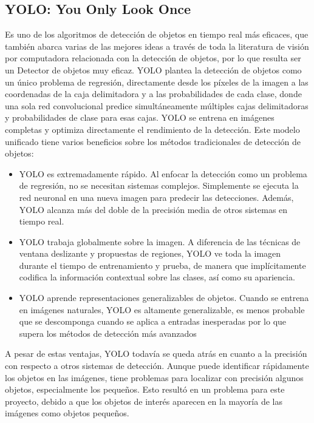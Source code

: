 \subsection{YOLO: You Only Look Once}
   Es uno de los algoritmos de detección de objetos en tiempo real más eficaces, que también abarca varias de las mejores ideas a través de toda la literatura de visión por computadora relacionada con la detección de objetos, por lo que resulta ser un Detector de objetos muy eficaz.
   YOLO \cite{yolo} plantea la detección de objetos como un único problema de regresión, directamente desde los píxeles de la imagen a las coordenadas de la caja delimitadora y a las probabilidades de cada clase, donde una sola red convolucional predice simultáneamente múltiples cajas delimitadoras y probabilidades de clase para esas cajas. YOLO se entrena en imágenes completas y optimiza directamente el rendimiento de la detección. Este modelo unificado tiene varios beneficios sobre los métodos tradicionales de detección de objetos:
   
   \begin{itemize}
        \item YOLO es extremadamente rápido.
            Al enfocar la detección como un problema de regresión, no se necesitan sistemas complejos. Simplemente se ejecuta la red neuronal en una nueva imagen para predecir las detecciones. Además, YOLO alcanza más del doble de la precisión media de otros sistemas en tiempo real.
        \item YOLO trabaja globalmente sobre la imagen. A diferencia de las técnicas de ventana deslizante y propuestas de regiones, YOLO ve toda la imagen durante el tiempo de entrenamiento y prueba, de manera que implícitamente codifica la información contextual sobre las clases, así como su apariencia.
        \item YOLO aprende representaciones generalizables de objetos. Cuando se entrena en imágenes naturales, YOLO es altamente generalizable, es menos probable que se descomponga cuando se aplica a entradas inesperadas por lo que supera los métodos de detección más avanzados
   \end{itemize}
   
   A pesar de estas ventajas, YOLO todavía se queda atrás en cuanto a la precisión con respecto a otros sistemas de detección. Aunque puede identificar rápidamente los objetos en las imágenes, tiene problemas para localizar con precisión algunos objetos, especialmente los pequeños. Esto resultó en un problema para este proyecto, debido a que los objetos de interés aparecen en la mayoría de las imágenes como objetos pequeños.
   

